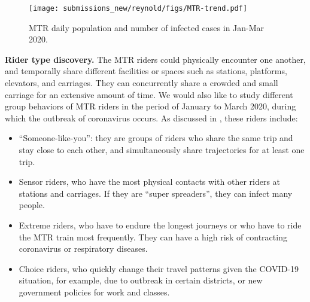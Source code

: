 \documentclass[11pt]{article}
\begin{document}
\begin{figure}[!hbt]
\centering
\texttt{[image: submissions\_new/reynold/figs/MTR-trend.pdf]}
\caption{MTR daily population and number of infected cases in Jan-Mar 2020.}
\label{fig:MTR-trend}
\end{figure}


{\bf Rider type discovery.} The MTR riders could physically encounter one another, and temporally share different facilities or spaces such as stations, platforms, elevators, and carriages. They can concurrently share a crowded and small carriage for an extensive amount of time. We would also like to study different group behaviors of MTR riders in the period of January to March 2020, during which the outbreak of coronavirus occurs. As discussed in \cite{zhou2020familiar}, these riders include:

\begin{itemize}
	\item ``Someone-like-you'': they are groups of riders who share the same trip and stay close to each other, and simultaneously share trajectories for at least one trip. 
	
	\item Sensor riders, who have the most physical contacts with other riders at stations and carriages. If they are ``super spreaders'', they can infect many people. 

	\item Extreme riders, who have to endure the longest journeys or who have to ride the MTR train most frequently. They can have a high risk of contracting coronavirus or respiratory diseases.

	\item Choice riders, who quickly change their travel patterns given the COVID-19 situation, for example, due to outbreak in certain districts, or new government policies for work and classes. 

\end{itemize}
\end{document}
